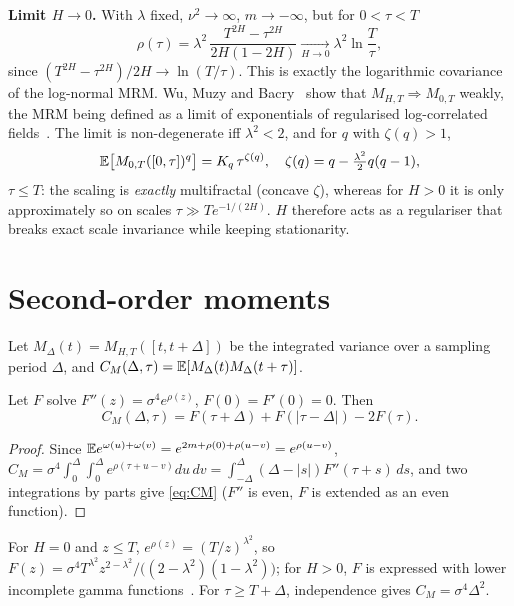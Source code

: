 \documentclass[10pt,twocolumn]{article}
\begin{document}
\textbf{Limit $H\to0$.} With $\lambda$ fixed, $\nu^2\to\infty$, $m\to-\infty$, but for $0<\tau<T$
\begin{equation}
\rho(\tau)=\lambda^2\,\frac{T^{2H}-\tau^{2H}}{2H(1-2H)}\xrightarrow[H\to0]{}\lambda^2\ln\frac{T}{\tau},
\end{equation}
since $(T^{2H}-\tau^{2H})/2H\to\ln(T/\tau)$. This is exactly the logarithmic covariance of the log-normal MRM. Wu, Muzy and Bacry~\cite{wu2022} show that $M_{H,T}\Rightarrow M_{0,T}$ weakly, the MRM being defined as a limit of exponentials of regularised log-correlated fields~\cite{kahane1985,bacry2001}. The limit is non-degenerate iff $\lambda^2<2$, and for $q$ with $\zeta(q)>1$,
\begin{equation}
\mathbb{E}\big[M_{0,T}([0,\tau])^q\big]=K_q\,\tau^{\zeta(q)},\quad \zeta(q)=q-\tfrac{\lambda^2}{2}q(q-1),
\end{equation}
$\tau\le T$: the scaling is \emph{exactly} multifractal (concave $\zeta$), whereas for $H>0$ it is only approximately so on scales $\tau\gg T e^{-1/(2H)}$. $H$ therefore acts as a regulariser that breaks exact scale invariance while keeping stationarity.

\section{Second-order moments}
Let $M_\Delta(t)=M_{H,T}([t,t+\Delta])$ be the integrated variance over a sampling period $\Delta$, and $C_M(\Delta,\tau)=\mathbb{E}[M_\Delta(t)M_\Delta(t+\tau)]$.
\begin{proposition}
Let $F$ solve $F''(z)=\sigma^4e^{\rho(z)}$, $F(0)=F'(0)=0$. Then
\begin{equation}\label{eq:CM}
C_M(\Delta,\tau)=F(\tau+\Delta)+F(|\tau-\Delta|)-2F(\tau).
\end{equation}
\end{proposition}
\begin{proof}
Since $\mathbb{E} e^{\omega(u)+\omega(v)}=e^{2m+\rho(0)+\rho(u-v)}=e^{\rho(u-v)}$,
$C_M=\sigma^4\!\int_0^\Delta\!\!\int_0^\Delta e^{\rho(\tau+u-v)}du\,dv=\int_{-\Delta}^{\Delta}(\Delta-|s|)F''(\tau+s)\,ds$, and two integrations by parts give \eqref{eq:CM} ($F''$ is even, $F$ is extended as an even function).
\end{proof}
For $H=0$ and $z\le T$, $e^{\rho(z)}=(T/z)^{\lambda^2}$, so $F(z)=\sigma^4T^{\lambda^2}z^{2-\lambda^2}/\big((2-\lambda^2)(1-\lambda^2)\big)$; for $H>0$, $F$ is expressed with lower incomplete gamma functions~\cite{wu2022}. For $\tau\ge T+\Delta$, independence gives $C_M=\sigma^4\Delta^2$.
\end{document}
